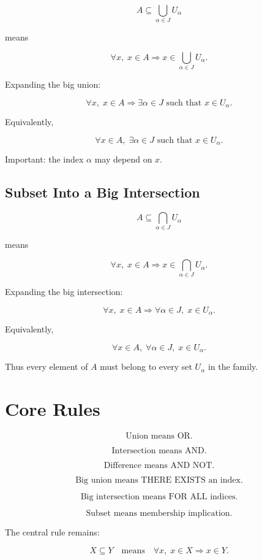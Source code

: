 \documentclass{article}
\begin{document}
	$$
	A \subseteq \bigcup_{\alpha \in J} U_\alpha
	$$
	
	means
	
	$$
	\forall x,\; x \in A \Rightarrow x \in \bigcup_{\alpha \in J} U_\alpha.
	$$
	
	Expanding the big union:
	
	$$
	\forall x,\; x \in A \Rightarrow
	\exists \alpha \in J \text{ such that } x \in U_\alpha.
	$$
	
	Equivalently,
	
	$$
	\forall x \in A,\; \exists \alpha \in J \text{ such that } x \in U_\alpha.
	$$
	
	Important: the index $\alpha$ may depend on $x$.
	
	\subsection{Subset Into a Big Intersection}
	
	$$
	A \subseteq \bigcap_{\alpha \in J} U_\alpha
	$$
	
	means
	
	$$
	\forall x,\; x \in A \Rightarrow x \in \bigcap_{\alpha \in J} U_\alpha.
	$$
	
	Expanding the big intersection:
	
	$$
	\forall x,\; x \in A \Rightarrow
	\forall \alpha \in J,\; x \in U_\alpha.
	$$
	
	Equivalently,
	
	$$
	\forall x \in A,\; \forall \alpha \in J,\; x \in U_\alpha.
	$$
	
	Thus every element of $A$ must belong to every set $U_\alpha$ in the family.
	
	\section{Core Rules}
	
	$$
	\text{Union means OR.}
	$$
	
	$$
	\text{Intersection means AND.}
	$$
	
	$$
	\text{Difference means AND NOT.}
	$$
	
	$$
	\text{Big union means THERE EXISTS an index.}
	$$
	
	$$
	\text{Big intersection means FOR ALL indices.}
	$$
	
	$$
	\text{Subset means membership implication.}
	$$
	
	The central rule remains:
	
	$$
	X \subseteq Y
	\quad \text{means} \quad
	\forall x,\; x \in X \Rightarrow x \in Y.
	$$
	
\end{document}
